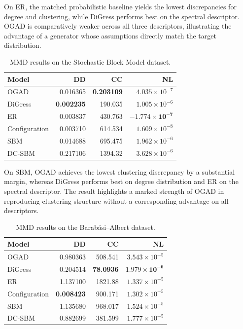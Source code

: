 On ER, the matched probabilistic baseline yields the lowest discrepancies for degree and clustering, while DiGress performs best on the spectral descriptor.
OGAD is comparatively weaker across all three descriptors, illustrating the advantage of a generator whose assumptions directly match the target distribution.

\begin{table}[H]
    \centering
    \caption{MMD results on the Stochastic Block Model dataset.}
    \label{tab:exp_sbm}
    \begin{tabular}{lrrr}
        \hline
        Model & DD & CC & NL \\
        \hline
        OGAD          & 0.016365 & \textbf{0.203109} & \(4.035\times10^{-7}\) \\
        DiGress       & \textbf{0.002235} & 190.035 & \(1.005\times10^{-6}\) \\
        ER            & 0.003837 & 430.763 & \(\mathbf{-1.774\times10^{-7}}\) \\
        Configuration & 0.003710 & 614.534 & \(1.609\times10^{-8}\) \\
        SBM           & 0.014688 & 695.475 & \(1.962\times10^{-6}\) \\
        DC-SBM        & 0.217106 & 1394.32 & \(3.628\times10^{-6}\) \\
        \hline
    \end{tabular}
\end{table}

On SBM, OGAD achieves the lowest clustering discrepancy by a substantial margin, whereas DiGress performs best on degree distribution and ER on the spectral descriptor.
The result highlights a marked strength of OGAD in reproducing clustering structure without a corresponding advantage on all descriptors.

\begin{table}[H]
    \centering
    \caption{MMD results on the Barab\'asi--Albert dataset.}
    \label{tab:exp_ba}
    \begin{tabular}{lrrr}
        \hline
        Model & DD & CC & NL \\
        \hline
        OGAD          & 0.980363 & 508.541 & \(3.543\times10^{-5}\) \\
        DiGress       & 0.204514 & \textbf{78.0936} & \(\mathbf{1.979\times10^{-6}}\) \\
        ER            & 1.137100 & 1821.88 & \(1.337\times10^{-5}\) \\
        Configuration & \textbf{0.008423} & 900.171 & \(1.302\times10^{-5}\) \\
        SBM           & 1.135680 & 968.017 & \(1.524\times10^{-5}\) \\
        DC-SBM        & 0.882699 & 381.599 & \(1.777\times10^{-5}\) \\
        \hline
    \end{tabular}
\end{table}

